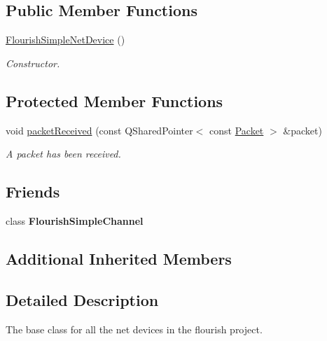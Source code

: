 \subsection*{Public Member Functions}
\begin{DoxyCompactItemize}
\item 
\hyperlink{classFlourishSimpleNetDevice_a5578959092ee4a469a43dfbcc20437cc}{Flourish\+Simple\+Net\+Device} ()\hypertarget{classFlourishSimpleNetDevice_a5578959092ee4a469a43dfbcc20437cc}{}\label{classFlourishSimpleNetDevice_a5578959092ee4a469a43dfbcc20437cc}

\begin{DoxyCompactList}\small\item\em Constructor. \end{DoxyCompactList}\end{DoxyCompactItemize}
\subsection*{Protected Member Functions}
\begin{DoxyCompactItemize}
\item 
void \hyperlink{classFlourishSimpleNetDevice_a9933898ca4f69e6c09142fc17d73596b}{packet\+Received} (const Q\+Shared\+Pointer$<$ const \hyperlink{classV2XMessage}{Packet} $>$ \&packet)
\begin{DoxyCompactList}\small\item\em A packet has been received. \end{DoxyCompactList}\end{DoxyCompactItemize}
\subsection*{Friends}
\begin{DoxyCompactItemize}
\item 
class {\bfseries Flourish\+Simple\+Channel}\hypertarget{classFlourishSimpleNetDevice_a0303c7d51c2540889f5d111604421b0a}{}\label{classFlourishSimpleNetDevice_a0303c7d51c2540889f5d111604421b0a}

\end{DoxyCompactItemize}
\subsection*{Additional Inherited Members}


\subsection{Detailed Description}
The base class for all the net devices in the flourish project. 

